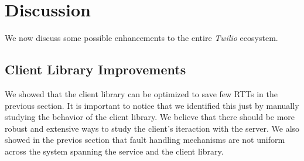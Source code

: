 \section{Discussion}
\label{sec-discussion}
We now discuss some possible enhancements to the entire \textit{Twilio} ecosystem. 

\subsection{Client Library Improvements}
We showed that the client library can be optimized to save few RTTs in the previous section. It is important to notice that we identified this just by manually studying the behavior of the client library. We believe that there should be more robust and extensive ways to study the client's iteraction with the server. We also showed in the previos section that fault handling mechanisms are not uniform across the system spanning the service and the client library.  
